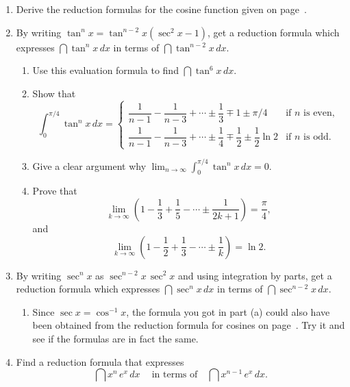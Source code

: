 \begin{enumerate}
\item Derive the reduction formulas for the cosine function given on
page~\pageref{cosred}.


\item By writing $\tan^n{x}=\tan^{n-2}{x}(\sec^2{x}-1)$, get a
reduction formula which expresses $\dint \tan^n{x}\,dx$ in terms of
$\dint \tan^{n-2}{x}\,dx$.

  \begin{enumerate}
  \item Use this evaluation formula to find $\dint \tan^6{x}\,dx.$


  \item Show that
\[
\int_0^{\pi/4}\tan^n{x}\,dx =
\begin{cases}
\dfrac{1}{n-1}- \dfrac{1}{n-3}+\cdots\pm \dfrac{1}{3}\mp 1\pm {\pi/4} 
     &\text{if $n$ is even}, \\[10pt]
\dfrac{1}{n-1}- \dfrac{1}{n-3}+\cdots \pm \dfrac{1}{4}\mp \dfrac{1}{2}
             \pm \dfrac{1}{2}\ln{2} 
     &\text{if $n$ is odd}.
\end{cases}
\]


  \item Give a clear argument why \quad $\displaystyle
\lim_{n\rightarrow\infty}\int_0^{\pi/4} \tan^n{x}\,dx=0$.

  \item Prove that
\[
\lim_{k\rightarrow\infty}\left(1-\dfrac{1}{3}+\dfrac{1}{5}
      -\cdots\pm \dfrac{1}{2k+1}\right)=\dfrac{\pi}{4},
\]
and
\[
\lim_{k\rightarrow\infty}\left(1-\dfrac{1}{2}+\dfrac{1}{3}
       -\cdots\pm \dfrac{1}{k}\right)=\ln{2}.
\]


\end{enumerate}
\item By writing $\sec^n{x}$ as $\sec^{n-2}{x}\,\sec^2{x}$ and using
integration by parts, get a reduction formula which expresses $\dint
\sec^n{x}\,dx$ in terms of $\dint \sec^{n-2}{x}\,dx$.

  \begin{enumerate}
  \item Since $\sec{x}=\cos^{-1}{x}$, the formula you got in part (a)
could also have been obtained from the reduction formula for cosines
on page~\pageref{cosred}.  Try it and see if the formulas are in fact
the same.


\end{enumerate}
\item Find a reduction formula that expresses
\[
\dint x^n\,e^x\,dx \ \quad \text{in terms of} \quad \dint x^{n-1}\,e^x\,dx.
\]



\end{enumerate}
